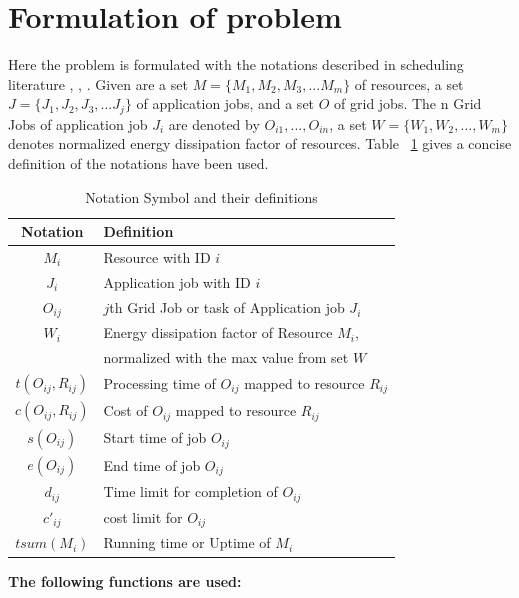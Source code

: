 \section{Formulation of problem}
\label{formulation}
Here the problem is formulated with the notations described in scheduling literature \cite{brucker2004scheduling}, \cite{brucker2006scheduling}, \cite{jakob2008fast}. Given are a set $M = \{M_1, M_2, M_3, ... M_m\}$ of resources, a set $J = \{J_1, J_2, J_3, ... J_j\}$ of application jobs, and a set $O$ of grid jobs. The n Grid Jobs of application job $J_i$ are denoted by $O_{i1},..., O_{in}$, a set $W= \{W_1,W_2,\ldots,W_m\}$ denotes normalized energy dissipation factor of resources. Table ~\ref{notation1} gives a concise definition of the notations have been used.\\
\begin{table}[!ht]
\caption{Notation Symbol and their definitions}
\centering
    \begin{tabular}{|c|l|}
    \hline \hline
    Notation & Definition  \\ \hline
    $M_i$ & Resource with ID $i$ \\ \hline
    $J_i$ & Application job with ID $i$ \\ \hline
    $O_{ij}$ & $j$th Grid Job or task of Application job $J_i$ \\ \hline
    $W_i$ & Energy dissipation factor of Resource $M_i$, \\
	  & normalized with the max value from set $W$ \\ \hline
    $t(O_{ij},R_{ij})$ & Processing time of $O_{ij}$ mapped to resource $R_{ij}$ \\ \hline
    $c(O_{ij},R_{ij})$ & Cost of $O_{ij}$ mapped to resource $R_{ij}$ \\ \hline
    $s(O_{ij})$ & Start time of job $O_{ij}$ \\ \hline
    $e(O_{ij})$ & End time of job $O_{ij}$ \\ \hline
    $d_{ij}$ & Time limit for completion of $O_{ij}$ \\ \hline
    $c'_{ij}$ & cost limit for  $O_{ij}$ \\ \hline
    $tsum(M_i)$ & Running time or Uptime of $M_i$ \\ \hline
    \end{tabular}
\label{notation1}
\end{table}
\textbf{The following functions are used:}
